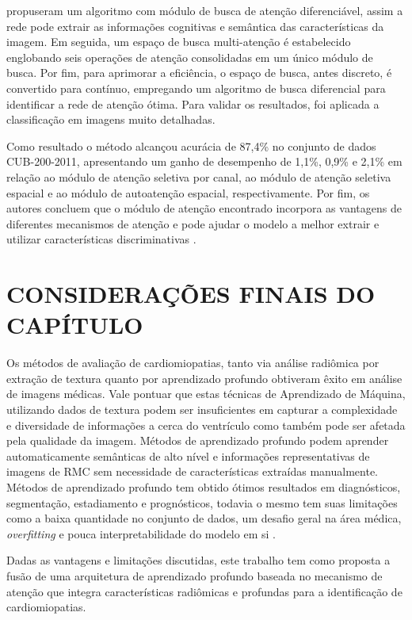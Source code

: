  propuseram um algoritmo com módulo de busca de atenção diferenciável, assim a rede pode extrair as informações cognitivas e semântica das características da imagem. Em seguida, um espaço de busca multi-atenção é estabelecido englobando seis operações de atenção consolidadas em um único módulo de busca. Por fim, para aprimorar a eficiência, o espaço de busca, antes discreto, é convertido para contínuo, empregando um algoritmo de busca diferencial para identificar a rede de atenção ótima. Para validar os resultados, foi aplicada a classificação em imagens  muito detalhadas. 

Como resultado o método alcançou acurácia de 87,4\% no conjunto de dados CUB-200-2011, apresentando um ganho de desempenho de 1,1\%, 0,9\% e 2,1\% em relação ao módulo de atenção seletiva por canal, ao módulo de atenção seletiva espacial e ao módulo de autoatenção espacial, respectivamente. Por fim, os autores concluem que o módulo de atenção encontrado incorpora as vantagens de diferentes mecanismos de atenção e pode ajudar o modelo a melhor extrair e utilizar características discriminativas \cite{yangNeuralNetworkDesign2024a}.




\section{CONSIDERAÇÕES FINAIS DO CAPÍTULO}
\label{sec:consideracoes_finais}

Os métodos de avaliação de cardiomiopatias, tanto via análise radiômica por extração de textura quanto por aprendizado profundo obtiveram êxito em análise de imagens médicas. Vale pontuar que estas técnicas de Aprendizado de Máquina, utilizando dados de textura podem ser insuficientes em capturar a complexidade e diversidade de informações a cerca do ventrículo como também pode ser afetada pela qualidade da imagem. Métodos de aprendizado profundo podem aprender automaticamente semânticas de alto nível e informações representativas de imagens de \gls{RMC} sem necessidade de características extraídas manualmente.
Métodos de aprendizado profundo tem obtido ótimos resultados em diagnósticos, segmentação, estadiamento e prognósticos, todavia o mesmo tem suas limitações como a baixa quantidade no conjunto de dados, um desafio geral na área médica, \textit{overfitting} e pouca interpretabilidade do modelo em si \cite{pontoneClinicalApplicationsCardiac2022}.

Dadas as vantagens e limitações discutidas, este trabalho tem como proposta a fusão de uma arquitetura de aprendizado profundo baseada no mecanismo de atenção que integra características radiômicas e profundas para a identificação de cardiomiopatias. 

